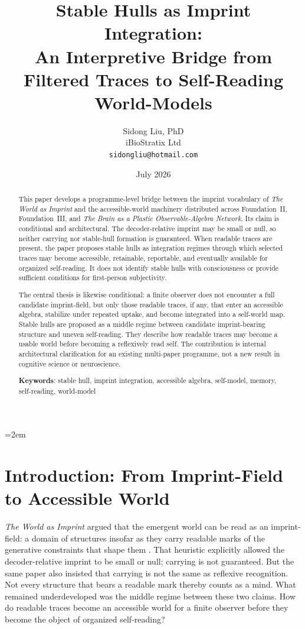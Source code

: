 \documentclass[12pt,a4paper]{article}
\title{Stable Hulls as Imprint Integration:\\
An Interpretive Bridge from Filtered Traces to Self-Reading World-Models}
\author{
  Sidong Liu, PhD \\
  iBioStratix Ltd \\
  \texttt{sidongliu@hotmail.com}
}
\date{July 2026}
\begin{document}
\emergencystretch=2em
\raggedbottom
{}

\maketitle

\begin{abstract}
This paper develops a programme-level bridge between the imprint vocabulary of \emph{The World as Imprint} and the accessible-world machinery distributed across Foundation~II, Foundation~III, and \emph{The Brain as a Plastic Observable-Algebra Network}. Its claim is conditional and architectural. The decoder-relative imprint may be small or null, so neither carrying nor stable-hull formation is guaranteed. When readable traces are present, the paper proposes stable hulls as integration regimes through which selected traces may become accessible, retainable, reportable, and eventually available for organized self-reading. It does not identify stable hulls with consciousness or provide sufficient conditions for first-person subjectivity.

The central thesis is likewise conditional: a finite observer does not encounter a full candidate imprint-field, but only those readable traces, if any, that enter an accessible algebra, stabilize under repeated uptake, and become integrated into a self-world map. Stable hulls are proposed as a middle regime between candidate imprint-bearing structure and uneven self-reading. They describe how readable traces may become a usable world before becoming a reflexively read self. The contribution is internal architectural clarification for an existing multi-paper programme, not a new result in cognitive science or neuroscience.

\medskip

\noindent\textbf{Keywords}: stable hull, imprint integration, accessible algebra, self-model, memory, self-reading, world-model
\end{abstract}

\section{Introduction: From Imprint-Field to Accessible World}

\emph{The World as Imprint} argued that the emergent world can be read as an imprint-field: a domain of structures insofar as they carry readable marks of the generative constraints that shape them \cite{WorldImprint}. That heuristic explicitly allowed the decoder-relative imprint to be small or null; carrying is not guaranteed. But the same paper also insisted that carrying is not the same as reflexive recognition. Not every structure that bears a readable mark thereby counts as a mind. What remained underdeveloped was the middle regime between these two claims. How do readable traces become an accessible world for a finite observer before they become the object of organized self-reading?
\end{document}
